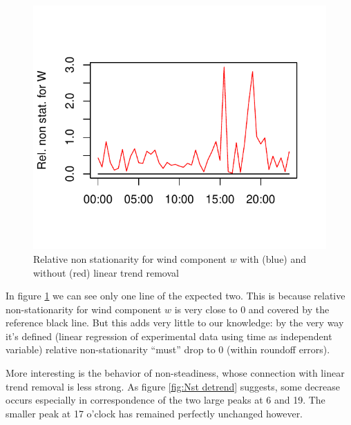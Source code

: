 \documentclass[a4paper,10pt]{book}
\begin{document}
\begin{figure}[htp]
 \centering
 \begin{center}
 \includegraphics[scale=1.1,keepaspectratio=true]{./diagrams/WRnsDetrend.pdf}
 \end{center}
 \caption{Relative non stationarity for wind component $w$ with (blue) and without (red) linear trend removal}
 \label{fig:Rns detrend}
\end{figure}

In figure \ref{fig:Rns detrend} we can see only one line of the expected two. This is because relative non-stationarity for wind component $w$ is very close to 0 and covered by the reference black line. But this adds very little to our knowledge: by the very way it's defined (linear regression of experimental data using time as independent variable) relative non-stationarity ``must'' drop to 0 (within roundoff errors).

More interesting is the behavior of non-steadiness, whose connection with linear trend removal is less strong. As figure \ref{fig:Nst detrend} suggests, some decrease occurs especially in correspondence of the two large peaks at 6 and 19. The smaller peak at 17 o'clock has remained perfectly unchanged however.
\end{document}
